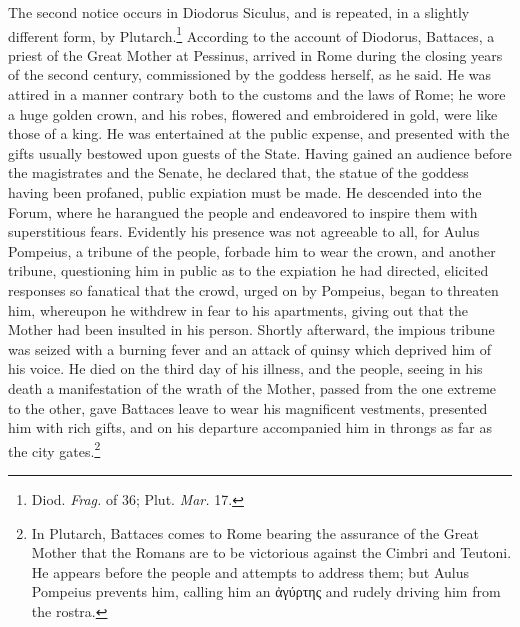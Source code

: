 \documentclass[a4paper, 11pt, oneside, polutonikogreek, french]{article}
\begin{document}
The second notice occurs in Diodorus Siculus, and is repeated, in a slightly different form, by Plutarch.\footnote{Diod. \emph{Frag.} of 36; Plut. \emph{Mar.} 17.} According to the account of Diodorus, Battaces, a priest of the Great Mother at Pessinus, arrived in Rome during the closing years of the second century, commissioned by the goddess herself, as he said. He was attired in a manner contrary both to the customs and the laws of Rome; he wore a huge golden crown, and his robes, flowered and embroidered in gold, were like those of a king. He was entertained at the public expense, and presented with the gifts usually bestowed upon guests of the State. Having gained an audience before the magistrates and the Senate, he declared that, the statue of the goddess having been profaned, public expiation must be made. He descended into the Forum, where he harangued the people and endeavored to inspire them with superstitious fears. Evidently his presence was not agreeable to all, for Aulus Pompeius, a tribune of the people, forbade him to wear the crown, and another tribune, questioning him in public as to the expiation he had directed, elicited responses so fanatical that the crowd, urged on by Pompeius, began to threaten him, whereupon he withdrew in fear to his apartments, giving out that the Mother had been insulted in his person. Shortly afterward, the impious tribune was seized with a burning fever and an attack of quinsy which deprived him of his voice. He died on the third day of his illness, and the people, seeing in his death a manifestation of the wrath of the Mother, passed from the one extreme to the other, gave Battaces leave to wear his magnificent vestments, presented him with rich gifts, and on his departure accompanied him in throngs as far as the city gates.\footnote{In Plutarch, Battaces comes to Rome bearing the assurance of the Great Mother that the Romans are to be victorious against the Cimbri and Teutoni. He appears before the people and attempts to address them; but Aulus Pompeius prevents him, calling him an ἀγύρτης and rudely driving him from the rostra.}
\end{document}
